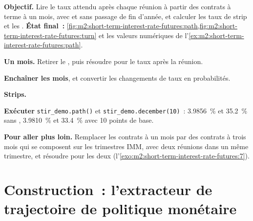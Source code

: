 \begin{tutorial}
\textbf{Objectif.} Lire le taux attendu après chaque réunion à partir des contrats à terme à un mois,
avec et sans passage de fin d'année, et calculer les taux de strip et les
. \textbf{État final~:}
\cref{fig:m2:short-term-interest-rate-futures:path,fig:m2:short-term-interest-rate-futures:turn}
et les valeurs numériques de l'\cref{ex:m2:short-term-interest-rate-futures:path}.
\begin{tutsteps}
\item \textbf{Un mois.} Retirer le , puis résoudre pour le taux après la réunion.
\label{lst:m2:short-term-interest-rate-futures:after}
\item \textbf{Enchaîner les mois}, et convertir les changements de taux en probabilités.
\label{lst:m2:short-term-interest-rate-futures:path}
\item \textbf{Strips.}
\label{lst:m2:short-term-interest-rate-futures:strip}
\item \textbf{Exécuter} \texttt{stir\_demo.path()} et \texttt{stir\_demo.december(10)}~:
3.9856~\% et 35.2~\% sans , 3.9810~\% et 33.4~\% avec 10 points de base.
\end{tutsteps}
\textbf{Pour aller plus loin.} Remplacer les contrats à un mois par des contrats à trois mois
qui se composent sur les trimestres IMM, avec deux réunions dans un même trimestre,
et résoudre pour les deux (l'\cref{exo:m2:short-term-interest-rate-futures:7}).
\end{tutorial}

\section{Construction~: l'extracteur de trajectoire de politique monétaire}\label{bld:m2:short-term-interest-rate-futures:meetings}

